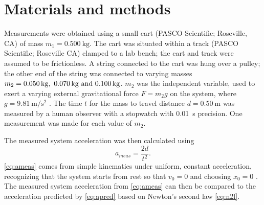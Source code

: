 ﻿\documentclass[reprint,amsmath,amssymb,aps,twoside]{revtex4-2}
\begin{document}
\section{Materials and methods}

Measurements were obtained using a small cart (PASCO Scientific; Roseville, CA) of mass $m_1=\qty{0.500}{\kilo\gram}$. The cart was situated within a track (PASCO Scientific; Roseville CA) clamped to a lab bench; the cart and track were assumed to be frictionless.  A string connected to the cart was hung over a pulley; the other end of the string was connected to varying masses $m_2=\qtylist{0.050;0.070;0.100}{\kilo\gram}$. $m_2$ was the independent variable, used to exert a varying external gravitational force $F=m_2 g$ on the system, where $g=\qty{9.81}{\meter\per\second\squared}$ \cite{tipler}. The time $t$ for the mass to travel distance $d=\qty{0.50}{\meter}$ was measured by a human observer with a stopwatch with \qty{0.01}{\second} precision. One measurement was made for each value of $m_2$.  

The measured system acceleration was then calculated using 
\begin{equation}
a_{meas} = \frac{2d}{t^2}.
\label{eq:ameas}
\end{equation}
\cref{eq:ameas} comes from simple kinematics under uniform, constant acceleration, recognizing that the system starts from rest so that $v_0=0$ and choosing $x_0=0$ \cite{tipler}.  The measured system acceleration from \cref{eq:ameas} can then be compared to the acceleration predicted by \cref{eq:apred} based on Newton's second law \cref{eq:n2l}. 
\end{document}
